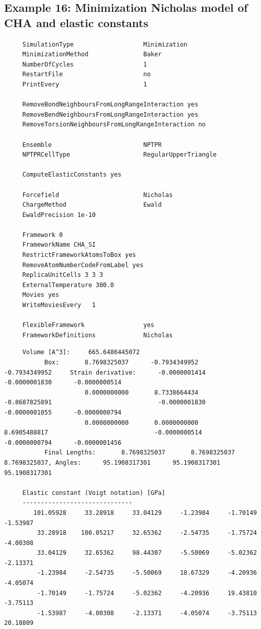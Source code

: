 \subsection*{Example 16: Minimization Nicholas model of CHA and elastic constants}
\begin{tiny}
\begin{verbatim}
     SimulationType                   Minimization
     MinimizationMethod               Baker
     NumberOfCycles                   1
     RestartFile                      no
     PrintEvery                       1
     
     RemoveBondNeighboursFromLongRangeInteraction yes
     RemoveBendNeighboursFromLongRangeInteraction yes
     RemoveTorsionNeighboursFromLongRangeInteraction no
     
     Ensemble                         NPTPR
     NPTPRCellType                    RegularUpperTriangle
     
     ComputeElasticConstants yes
     
     Forcefield                       Nicholas
     ChargeMethod                     Ewald
     EwaldPrecision 1e-10
     
     Framework 0
     FrameworkName CHA_SI
     RestrictFrameworkAtomsToBox yes
     RemoveAtomNumberCodeFromLabel yes
     ReplicaUnitCells 3 3 3
     ExternalTemperature 300.0
     Movies yes
     WriteMoviesEvery   1
     
     FlexibleFramework                yes
     FrameworkDefinitions             Nicholas
\end{verbatim}
\end{tiny}

\begin{tiny}
\begin{verbatim}
     Volume [A^3]:     665.6486445072
           Box:       8.7698325037      -0.7934349952      -0.7934349952     Strain derivative:      -0.0000001414      -0.0000001830      -0.0000000514
                      0.0000000000       8.7338664434      -0.8687825891                             -0.0000001830      -0.0000001055      -0.0000000794
                      0.0000000000       0.0000000000       8.6905488817                             -0.0000000514      -0.0000000794      -0.0000001456
           Final Lengths:       8.7698325037       8.7698325037       8.7698325037, Angles:      95.1908317301      95.1908317301      95.1908317301
     
     Elastic constant (Voigt notation) [GPa]
     ------------------------------
        101.05928     33.28918     33.04129     -1.23984     -1.70149     -1.53987
         33.28918    100.05217     32.65362     -2.54735     -1.75724     -4.00308
         33.04129     32.65362     98.44307     -5.50069     -5.02362     -2.13371
         -1.23984     -2.54735     -5.50069     18.67329     -4.20936     -4.05074
         -1.70149     -1.75724     -5.02362     -4.20936     19.43810     -3.75113
         -1.53987     -4.00308     -2.13371     -4.05074     -3.75113     20.18809
\end{verbatim}
\end{tiny}

